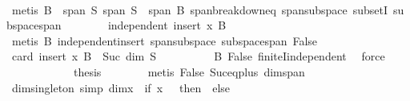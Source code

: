 \begin{isabellebody}
\ \ \ \ \ \ \ \ \isamarkupfalse%
\ {\isacharparenleft}{\kern0pt}metis\ {\isacartoucheopen}B\ {\isasymsubseteq}\ span\ S{\isacartoucheclose}\ {\isacartoucheopen}span\ S\ {\isasymsubseteq}\ span\ B{\isacartoucheclose}\ span{\isacharunderscore}{\kern0pt}breakdown{\isacharunderscore}{\kern0pt}eq\ span{\isacharunderscore}{\kern0pt}subspace\ subsetI\ subspace{\isacharunderscore}{\kern0pt}span{\isacharparenright}{\kern0pt}\isanewline
\ \ \ \ \ \ \isamarkupfalse%
\ {\isachardoublequoteopen}independent\ {\isacharparenleft}{\kern0pt}insert\ x\ B{\isacharparenright}{\kern0pt}{\isachardoublequoteclose}\isanewline
\ \ \ \ \ \ \ \ \isamarkupfalse%
\ {\isacharparenleft}{\kern0pt}metis\ B{\isacharparenleft}{\kern0pt}{}{\isacharminus}{\kern0pt}{}{\isacharparenright}{\kern0pt}\ independent{\isacharunderscore}{\kern0pt}insert\ span{\isacharunderscore}{\kern0pt}subspace\ subspace{\isacharunderscore}{\kern0pt}span\ False{\isacharparenright}{\kern0pt}\isanewline
\ \ \ \ \ \ \isamarkupfalse%
\ {\isachardoublequoteopen}card\ {\isacharparenleft}{\kern0pt}insert\ x\ B{\isacharparenright}{\kern0pt}\ {\isacharequal}{\kern0pt}\ Suc\ {\isacharparenleft}{\kern0pt}dim\ S{\isacharparenright}{\kern0pt}{\isachardoublequoteclose}\isanewline
\ \ \ \ \ \ \ \ \isamarkupfalse%
\ B\ False\ finiteI{\isacharunderscore}{\kern0pt}independent\ \isamarkupfalse%
\ force\isanewline
\ \ \ \ \isamarkupfalse%
\isanewline
\ \ \ \ \isamarkupfalse%
\ \isamarkupfalse%
\ {\isacharquery}{\kern0pt}thesis\isanewline
\ \ \ \ \ \ \isamarkupfalse%
\ {\isacharparenleft}{\kern0pt}metis\ False\ Suc{\isacharunderscore}{\kern0pt}eq{\isacharunderscore}{\kern0pt}plus{}\ dim{\isacharunderscore}{\kern0pt}span{\isacharparenright}{\kern0pt}\isanewline
\ \ \isamarkupfalse%
\isanewline
{}\isamarkupfalse%
%
\endisatagproof
{\isafoldproof}%
%
\isadelimproof
\isanewline
%
\endisadelimproof
\isanewline
{}\isamarkupfalse%
\ dim{\isacharunderscore}{\kern0pt}singleton\ {\isacharbrackleft}{\kern0pt}simp{\isacharbrackright}{\kern0pt}{\isacharcolon}{\kern0pt}\ {\isachardoublequoteopen}dim{\isacharbraceleft}{\kern0pt}x{\isacharbraceright}{\kern0pt}\ {\isacharequal}{\kern0pt}\ {\isacharparenleft}{\kern0pt}if\ x\ {\isacharequal}{\kern0pt}\ {}\ then\ {}\ else\ {}{\isacharparenright}{\kern0pt}{\isachardoublequoteclose}\isanewline
%
\isadelimproof
\ \ %
\endisadelimproof

\end{isabellebody}
